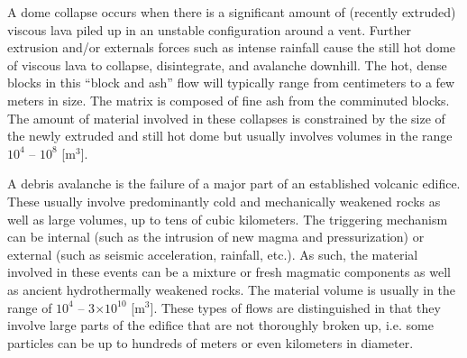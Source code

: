 \documentclass{article}
\begin{document}
A dome collapse occurs when there is a significant amount of (recently extruded) viscous lava piled up in an unstable configuration around a vent. Further extrusion and/or externals forces such as intense rainfall cause the still hot dome of viscous lava to collapse, disintegrate, and avalanche downhill. The hot, dense blocks in this ``block and ash'' flow will typically range from centimeters to a few meters in size. The matrix is composed of fine ash from the comminuted blocks. The amount of material involved in these collapses is constrained by the size of the newly extruded and still hot dome but usually involves volumes in the range $10^4$ -- $10^8$ [$\mathrm{m^3}$].

A debris avalanche is the failure of a major part of an established volcanic edifice. These usually involve predominantly cold and mechanically weakened rocks as well as large volumes, up to tens of cubic kilometers. The triggering mechanism can be internal (such as the intrusion of new magma and pressurization) or external (such as seismic acceleration, rainfall, etc.). As such, the material involved in these events can be a mixture or fresh magmatic components as well as ancient hydrothermally weakened rocks. The material volume is usually in the range of $10^4$ -- 3$\times10^{10}$ [$\mathrm{m^3}$]. These types of flows are distinguished in that they involve large parts of the edifice that are not thoroughly broken up, i.e. some particles can be up to hundreds of meters or even kilometers in diameter.
\end{document}
